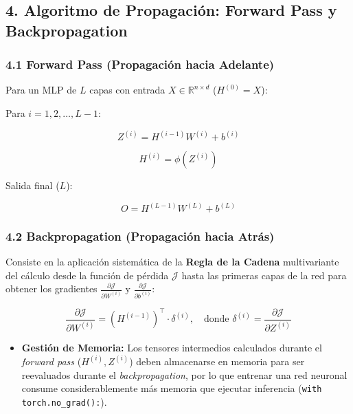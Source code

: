 \documentclass[11pt,oneside]{article}
\begin{document}
\begin{quote}\end{quote}

\begin{quote}\end{quote}

\subsection{4. Algoritmo de Propagación: Forward Pass y Backpropagation}

\subsubsection{4.1 Forward Pass (Propagación hacia Adelante)}

Para un MLP de \(L\) capas con entrada \(X \in \mathbb{R}^{n \times d}\) (\(H^{(0)} = X\)):

Para \(i = 1, 2, \dots, L-1\):

\[Z^{(i)} = H^{(i-1)} W^{(i)} + b^{(i)}\]

\[H^{(i)} = \phi(Z^{(i)})\]

Salida final (\(L\)):

\[O = H^{(L-1)} W^{(L)} + b^{(L)}\]

\subsubsection{4.2 Backpropagation (Propagación hacia Atrás)}

Consiste en la aplicación sistemática de la \textbf{Regla de la Cadena} multivariante del cálculo desde la función de pérdida \(\mathcal{J}\) hasta las primeras capas de la red para obtener los gradientes \(\frac{\partial \mathcal{J}}{\partial W^{(i)}}\) y \(\frac{\partial \mathcal{J}}{\partial b^{(i)}}\):

\[\frac{\partial \mathcal{J}}{\partial W^{(i)}} = (H^{(i-1)})^\top \cdot \delta^{(i)}, \quad \text{donde } \delta^{(i)} = \frac{\partial \mathcal{J}}{\partial Z^{(i)}}\]

\begin{itemize}

\item \textbf{Gestión de Memoria:} Los tensores intermedios calculados durante el \emph{forward pass} (\(H^{(i)}, Z^{(i)}\)) deben almacenarse en memoria para ser reevaluados durante el \emph{backpropagation}, por lo que entrenar una red neuronal consume considerablemente más memoria que ejecutar inferencia (\texttt{with torch.no\_grad():}).

\end{itemize}
\end{document}
